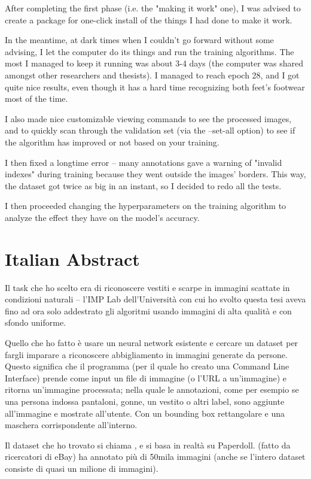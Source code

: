 After completing the first phase (i.e. the "making it work" one), I was advised to create a package for one-click install of the things I had done to make it work.

In the meantime, at dark times when I couldn't go forward without some advising, I let the computer do its things and run the training algorithms. The most I managed to keep it running was about 3-4 days (the computer was shared amongst other researchers and thesists). I managed to reach epoch 28, and I got quite nice results, even though it has a hard time recognizing both feet's footwear most of the time. 

I also made nice customizable viewing commands to see the processed images, and to quickly scan through the validation set (via the --set-all option) to see if the algorithm has improved or not based on your training.

I then fixed a longtime error -- many annotations gave a warning of "invalid indexes" during training because they went outside the images' borders. This way, the dataset got twice as big in an instant, so I decided to redo all the tests.

I then proceeded changing the hyperparameters on the training algorithm to analyze the effect they have on the model's accuracy.


\section*{Italian Abstract}

Il task che ho scelto era di riconoscere vestiti e scarpe in immagini scattate in condizioni naturali -- l'IMP Lab dell'Università con cui ho svolto questa tesi aveva fino ad ora solo addestrato gli algoritmi usando immagini di alta qualità e con sfondo uniforme.

Quello che ho fatto è usare un neural network esistente e cercare un dataset per fargli imparare a riconoscere abbigliamento in immagini generate da persone. Questo significa che il programma (per il quale ho creato una Command Line Interface) prende come input un file di immagine (o l'URL a un'immagine) e ritorna un'immagine processata; nella quale le annotazioni, come per esempio se una persona indossa pantaloni, gonne, un vestito o altri label, sono aggiunte all'immagine e mostrate all'utente. Con un bounding box rettangolare e una maschera corrispondente all'interno.

Il dataset che ho trovato si chiama \modanet, e si basa in realtà su Paperdoll.
\modanet (fatto da ricercatori di eBay) ha annotato più di 50mila immagini (anche se l'intero dataset consiste di quasi un milione di immagini).

